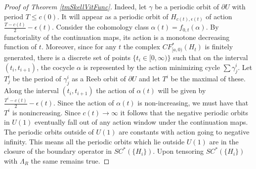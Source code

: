 \documentclass[11pt]{amsart}
\theoremstyle{definition}
\theoremstyle{remark}
\begin{document}
\begin{proof}[Proof of Theorem \ref{tmSkellVitFunc}]
Indeed, let $\gamma$ be a periodic orbit of $\partial U$ with period $T\leq c(0)$. It will appear as a periodic orbit of $H_{c(t),\epsilon(t)}$ of action $\frac{T-c(t)}{2}-\epsilon(t)$. Consider the cohomology class $\alpha(t)=f_{0,t}(\alpha)$. By functoriality of the continuation maps, its action is a monotone decreasing function of $t$. Moreover, since for any $t$ the complex $CF^*_{[a,0)}(H_t)$ is finitely generated, there is a discrete set of points $\{t_i\in[0,\infty)\}$ such that on the interval $(t_i,t_{i+1})$, the cocycle $\alpha$ is represented by the action minimizing cycle $\sum\gamma^i_j$. Let $T^i_j$ be the period of $\gamma^i_j$ as a Reeb orbit of $\partial U$ and let $T^i$ be the maximal of these. Along the interval $(t_i,t_{i+1})$ the action of $\alpha(t)$ will be given by $\frac{T^i-c(t)}{2}-\epsilon(t)$. Since the action of $\alpha(t)$ is non-increasing, we must have that $T^i$ is nonincreasing. Since $c(t)\to\infty$ it follows that the negative periodic orbits in $U(1)$ eventually fall out of any action window under the continuation maps. The periodic orbits outside of $U(1)$ are constants with action going to negative infinity. This means all the periodic orbits which lie outside $U(1)$ are in the closure of the boundary operator in $SC^*(\{H_i\})$. Upon tensoring $SC^*(\{H_i\})$ with $\Lambda_R$ the same remains true.
\end{proof}
\end{document}
